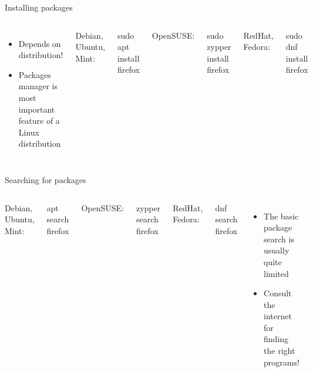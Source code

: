     \begin{frame}[t,fragile]{Installing packages}
        \begin{columns}[T]
            \begin{itemize}
                \item Depends on distribution!
                \item Packages manager is most important feature of a
                    Linux distribution
            \end{itemize}
            Debian, Ubuntu, Mint:
            \begin{bashenv}[\small]
sudo apt install firefox
            \end{bashenv}
            OpenSUSE:
            \begin{bashenv}[\small]
sudo zypper install firefox
            \end{bashenv}
            RedHat, Fedora:
            \begin{bashenv}[\small]
sudo dnf install firefox
            \end{bashenv}
        \end{columns}
    \end{frame}

    \begin{frame}[t,fragile]{Searching for packages}
        \begin{columns}[T]
            Debian, Ubuntu, Mint:
            \begin{bashenv}[\small]
apt search firefox
            \end{bashenv}
            OpenSUSE:
            \begin{bashenv}[\small]
zypper search firefox
            \end{bashenv}
            RedHat, Fedora:
            \begin{bashenv}[\small]
dnf search firefox
            \end{bashenv}
            \begin{itemize}
                \item The basic package search is usually quite limited
                \item Consult the internet for finding the right programs!
            \end{itemize}
        \end{columns}
    \end{frame}

